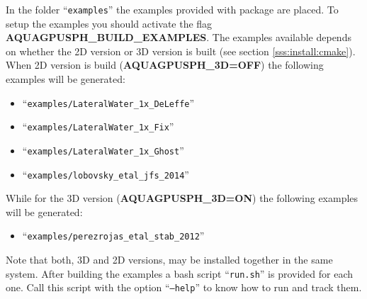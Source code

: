 In the folder ``\texttt{examples}'' the examples provided with \NAME package 
are placed.
%
To setup the examples you should activate the flag 
\textbf{AQUAGPUSPH\_BUILD\_EXAMPLES}.
%
The examples available depends on whether the 2D version or 3D version is 
built (see section \ref{sss:install:cmake}).
%
When 2D version is build (\textbf{AQUAGPUSPH\_3D=OFF}) the following examples 
will be generated:
%
\begin{itemize}
	\item ``\texttt{examples/LateralWater\_1x\_DeLeffe}''
	\item ``\texttt{examples/LateralWater\_1x\_Fix}''
	\item ``\texttt{examples/LateralWater\_1x\_Ghost}''
	\item ``\texttt{examples/lobovsky\_etal\_jfs\_2014}''
\end{itemize}
%
While for the 3D version (\textbf{AQUAGPUSPH\_3D=ON}) the following examples 
will be generated:
%
\begin{itemize}
	\item ``\texttt{examples/perezrojas\_etal\_stab\_2012}''
\end{itemize}

Note that both, 3D and 2D versions, may be installed together in the same 
system.
%
After building the examples a bash script ``\texttt{run.sh}'' is provided for 
each one.
%
Call this script with the option ``\texttt{--help}'' to know how to run and 
track them.